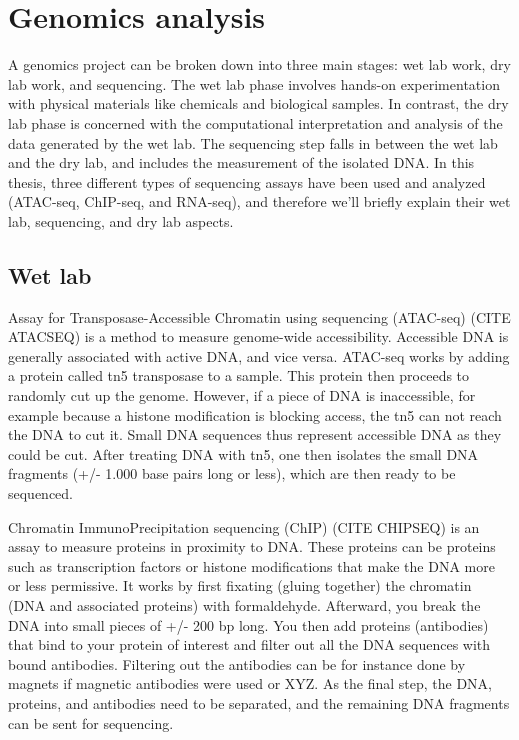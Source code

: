 \section{Genomics analysis}

A genomics project can be broken down into three main stages: wet lab work, dry lab work, and sequencing. The wet lab phase involves hands-on experimentation with physical materials like chemicals and biological samples. In contrast, the dry lab phase is concerned with the computational interpretation and analysis of the data generated by the wet lab. The sequencing step falls in between the wet lab and the dry lab, and includes the measurement of the isolated DNA. In this thesis, three different types of sequencing assays have been used and analyzed (ATAC-seq, ChIP-seq, and RNA-seq), and therefore we'll briefly explain their wet lab, sequencing, and dry lab aspects. 

\subsection{Wet lab}

Assay for Transposase-Accessible Chromatin using sequencing (ATAC-seq) (CITE ATACSEQ) is a method to measure genome-wide accessibility. Accessible DNA is generally associated with active DNA, and vice versa. ATAC-seq works by adding a protein called tn5 transposase to a sample. This protein then proceeds to randomly cut up the genome. However, if a piece of DNA is inaccessible, for example because a histone modification is blocking access, the tn5 can not reach the DNA to cut it. Small DNA sequences thus represent accessible DNA as they could be cut. After treating DNA with tn5, one then isolates the small DNA fragments (+/- 1.000 base pairs long or less), which are then ready to be sequenced.

Chromatin ImmunoPrecipitation sequencing (ChIP) (CITE CHIPSEQ) is an assay to measure proteins in proximity to DNA. These proteins can be proteins such as transcription factors or histone modifications that make the DNA more or less permissive. It works by first fixating (gluing together) the chromatin (DNA and associated proteins) with formaldehyde. Afterward, you break the DNA into small pieces of +/- 200 bp long. You then add proteins (antibodies) that bind to your protein of interest and filter out all the DNA sequences with bound antibodies. Filtering out the antibodies can be for instance done by magnets if magnetic antibodies were used or XYZ. As the final step, the DNA, proteins, and antibodies need to be separated, and the remaining DNA fragments can be sent for sequencing.


